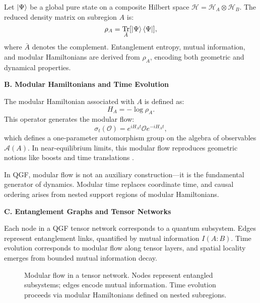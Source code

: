 \documentclass[11pt]{article}
\DeclareMathOperator*{\Tr}{Tr}
\def\left{}
\def\right{}
\begin{document}
Let \( \ket{\Psi} \) be a global pure state on a composite Hilbert space \( \mathcal{H} = \mathcal{H}_A \otimes \mathcal{H}_B \). The reduced density matrix on subregion \( A \) is:
\[
\rho_A = \Tr_{\bar{A}} \left[ \ket{\Psi} \bra{\Psi} \right],
\]
where \( \bar{A} \) denotes the complement. Entanglement entropy, mutual information, and modular Hamiltonians are derived from \( \rho_A \), encoding both geometric and dynamical properties.

\vspace{0.5em}
\noindent\textbf{B. Modular Hamiltonians and Time Evolution}

The modular Hamiltonian associated with \( A \) is defined as:
\[
H_A = -\log \rho_A.
\]
This operator generates the modular flow:
\[
\sigma_t(\mathcal{O}) = e^{i H_A t} \mathcal{O} e^{-i H_A t},
\]
which defines a one-parameter automorphism group on the algebra of observables \( \mathcal{A}(A) \). In near-equilibrium limits, this modular flow reproduces geometric notions like boosts and time translations \cite{Bisognano1976, Faulkner2013}.

In QGF, modular flow is not an auxiliary construction—it is the fundamental generator of dynamics. Modular time replaces coordinate time, and causal ordering arises from nested support regions of modular Hamiltonians.

\vspace{0.5em}
\noindent\textbf{C. Entanglement Graphs and Tensor Networks}

Each node in a QGF tensor network corresponds to a quantum subsystem. Edges represent entanglement links, quantified by mutual information \( I(A:B) \). Time evolution corresponds to modular flow along tensor layers, and spatial locality emerges from bounded mutual information decay.

\begin{figure}[H]
\centering
{}
\caption{Modular flow in a tensor network. Nodes represent entangled subsystems; edges encode mutual information. Time evolution proceeds via modular Hamiltonians defined on nested subregions.}
\label{fig:modular-flow}
\end{figure}
\end{document}
